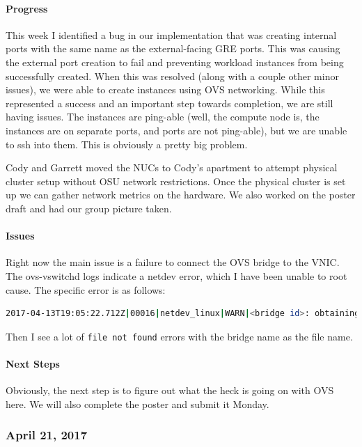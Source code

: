 \documentclass[10pt,onecolumn,journal,draftclsnofoot]{IEEEtran}
\begin{document}
\paragraph{Progress} 

This week I identified a bug in our implementation that was creating
internal ports with the same name as the external-facing GRE ports. This
was causing the external port creation to fail and preventing workload
instances from being successfully created. When this was resolved (along
with a couple other minor issues), we were able to create instances
using OVS networking. While this represented a success and an important
step towards completion, we are still having issues. The instances are
ping-able (well, the compute node is, the instances are on separate
ports, and ports are not ping-able), but we are unable to ssh into them.
This is obviously a pretty big problem.

Cody and Garrett moved the NUCs to Cody's apartment to attempt physical
cluster setup without OSU network restrictions. Once the physical
cluster is set up we can gather network metrics on the hardware. We also
worked on the poster draft and had our group picture taken.

\paragraph{Issues} 

Right now the main issue is a failure to connect the OVS bridge to the
VNIC. The ovs-vswitchd logs indicate a netdev error, which I have been
unable to root cause. The specific error is as follows:

\begin{lstlisting}[language=bash]
2017-04-13T19:05:22.712Z|00016|netdev_linux|WARN|<bridge id>: obtaining netdev stats via vport failed (Invalid argument)
\end{lstlisting}

Then I see a lot of \lstinline!file not found! errors with the bridge
name as the file name.

\paragraph{Next Steps} 

Obviously, the next step is to figure out what the heck is going on with
OVS here. We will also complete the poster and submit it Monday.

\subsubsection{April 21, 2017} 
\end{document}
